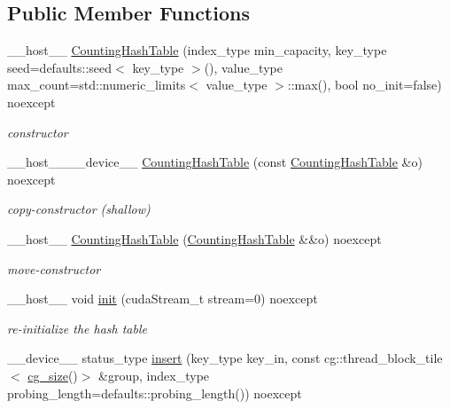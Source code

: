 \subsection*{Public Member Functions}
\begin{DoxyCompactItemize}
\item 
\+\_\+\+\_\+host\+\_\+\+\_\+ \hyperlink{classwarpcore_1_1CountingHashTable_a68946e67712e7b2afb95ddb7169a26fd}{Counting\+Hash\+Table} (index\+\_\+type min\+\_\+capacity, key\+\_\+type seed=defaults\+::seed$<$ key\+\_\+type $>$(), value\+\_\+type max\+\_\+count=std\+::numeric\+\_\+limits$<$ value\+\_\+type $>$\+::max(), bool no\+\_\+init=false) noexcept
\begin{DoxyCompactList}\small\item\em constructor \end{DoxyCompactList}\item 
\+\_\+\+\_\+host\+\_\+\+\_\+\+\_\+\+\_\+device\+\_\+\+\_\+ \hyperlink{classwarpcore_1_1CountingHashTable_afba99fa2513c3ca3c7708ac718d2b0fc}{Counting\+Hash\+Table} (const \hyperlink{classwarpcore_1_1CountingHashTable}{Counting\+Hash\+Table} \&o) noexcept
\begin{DoxyCompactList}\small\item\em copy-\/constructor (shallow) \end{DoxyCompactList}\item 
\+\_\+\+\_\+host\+\_\+\+\_\+ \hyperlink{classwarpcore_1_1CountingHashTable_ab1c1ea195d10fbbdb6a70e5f3bf96623}{Counting\+Hash\+Table} (\hyperlink{classwarpcore_1_1CountingHashTable}{Counting\+Hash\+Table} \&\&o) noexcept
\begin{DoxyCompactList}\small\item\em move-\/constructor \end{DoxyCompactList}\item 
\+\_\+\+\_\+host\+\_\+\+\_\+ void \hyperlink{classwarpcore_1_1CountingHashTable_aad536be8a1f0c71d3d84543423723445}{init} (cuda\+Stream\+\_\+t stream=0) noexcept
\begin{DoxyCompactList}\small\item\em re-\/initialize the hash table \end{DoxyCompactList}\item 
\+\_\+\+\_\+device\+\_\+\+\_\+ status\+\_\+type \hyperlink{classwarpcore_1_1CountingHashTable_a2cad25fea134d836cf1b75f67d6b38ac}{insert} (key\+\_\+type key\+\_\+in, const cg\+::thread\+\_\+block\+\_\+tile$<$ \hyperlink{classwarpcore_1_1CountingHashTable_aeaf1b333eb176da987dee4d003e5dddc}{cg\+\_\+size}()$>$ \&group, index\+\_\+type probing\+\_\+length=defaults\+::probing\+\_\+length()) noexcept

\end{DoxyCompactItemize}
